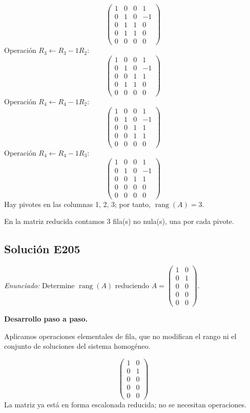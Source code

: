 \documentclass[12pt]{article}
\theoremstyle{remark}
\newcommand{\rang}{\operatorname{rang}}
\newcommand{\solucion}[2]{\Needspace{11\baselineskip}\subsection*{Solución E#1}\noindent\textit{Enunciado:} #2\par\medskip\noindent\textbf{Desarrollo paso a paso.}\par\medskip}
\begin{document}
\[
\begin{pmatrix}1&0&0&1\\0&1&0&-1\\0&1&1&0\\0&1&1&0\\0&0&0&0\end{pmatrix}
\]
Operación $R_{3}\leftarrow R_{3}-1R_{2}$:
\[
\begin{pmatrix}1&0&0&1\\0&1&0&-1\\0&0&1&1\\0&1&1&0\\0&0&0&0\end{pmatrix}
\]
Operación $R_{4}\leftarrow R_{4}-1R_{2}$:
\[
\begin{pmatrix}1&0&0&1\\0&1&0&-1\\0&0&1&1\\0&0&1&1\\0&0&0&0\end{pmatrix}
\]
Operación $R_{4}\leftarrow R_{4}-1R_{3}$:
\[
\begin{pmatrix}1&0&0&1\\0&1&0&-1\\0&0&1&1\\0&0&0&0\\0&0&0&0\end{pmatrix}
\]
Hay pivotes en las columnas 1, 2, 3; por tanto, $\boxed{\rang(A)=3}$.

En la matriz reducida contamos 3 fila(s) no nula(s), una por cada pivote.


\medskip

\solucion{205}{Determine $\rang(A)$ reduciendo $A=\begin{pmatrix}1&0\\0&1\\0&0\\0&0\\0&0\end{pmatrix}$.}
Aplicamos operaciones elementales de fila, que no modifican el rango ni el conjunto de soluciones del sistema homogéneo.

\[
\begin{pmatrix}1&0\\0&1\\0&0\\0&0\\0&0\end{pmatrix}
\]
La matriz ya está en forma escalonada reducida; no se necesitan operaciones.
\end{document}
